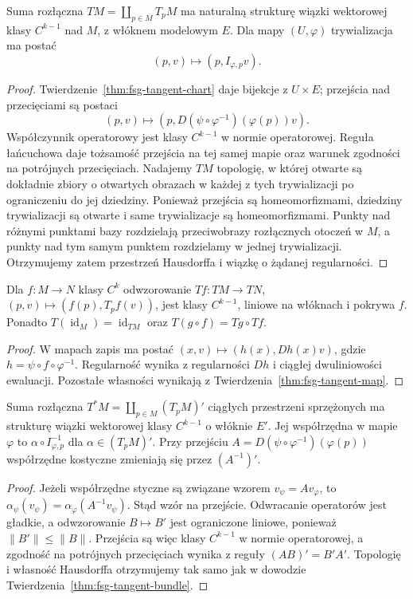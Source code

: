 \begin{twierdzenie}
\label{thm:fsg-tangent-bundle}
Suma rozłączna $TM=\coprod_{p\in M}T_pM$ ma naturalną
strukturę wiązki wektorowej klasy $C^{k-1}$ nad $M$,
z włóknem modelowym $E$. Dla mapy $(U,\varphi)$
trywializacja ma postać
\[
 (p,v)\longmapsto(p,I_{\varphi,p}v).
\]
\end{twierdzenie}
\begin{proof}
Twierdzenie~\ref{thm:fsg-tangent-chart} daje bijekcje
z $U\times E$; przejścia nad przecięciami są postaci
\[
 (p,v)\longmapsto
 (p,D(\psi\circ\varphi^{-1})(\varphi(p))v).
\]
Współczynnik operatorowy jest klasy $C^{k-1}$ w normie
operatorowej. Reguła łańcuchowa daje tożsamość
przejścia na tej samej mapie oraz warunek zgodności
na potrójnych przecięciach. Nadajemy $TM$ topologię,
w której otwarte są dokładnie zbiory o otwartych obrazach
w każdej z tych trywializacji po ograniczeniu do jej
dziedziny. Ponieważ przejścia są homeomorfizmami,
dziedziny trywializacji są otwarte i same trywializacje
są homeomorfizmami. Punkty nad różnymi punktami bazy
rozdzielają przeciwobrazy rozłącznych otoczeń w $M$,
a punkty nad tym samym punktem rozdzielamy w jednej
trywializacji. Otrzymujemy zatem przestrzeń Hausdorffa
i wiązkę o żądanej regularności.
\end{proof}

\begin{stwierdzenie}
\label{prop:fsg-tangent-functor}
Dla $f:M\to N$ klasy $C^k$ odwzorowanie
$Tf:TM\to TN$, $(p,v)\mapsto(f(p),T_pf(v))$,
jest klasy $C^{k-1}$, liniowe na włóknach i pokrywa $f$.
Ponadto $T(\operatorname{id}_M)=\operatorname{id}_{TM}$
oraz $T(g\circ f)=Tg\circ Tf$.
\end{stwierdzenie}
\begin{proof}
W mapach zapis ma postać $(x,v)\mapsto
(h(x),Dh(x)v)$, gdzie $h=\psi\circ f\circ\varphi^{-1}$.
Regularność wynika z regularności $Dh$ i ciągłej
dwuliniowości ewaluacji. Pozostałe własności wynikają
z Twierdzenia~\ref{thm:fsg-tangent-map}.
\end{proof}

\begin{twierdzenie}
\label{thm:fsg-cotangent-bundle}
Suma rozłączna $T^*M=\coprod_{p\in M}(T_pM)'$
ciągłych przestrzeni sprzężonych ma strukturę wiązki
wektorowej klasy $C^{k-1}$ o włóknie $E'$.
Jej współrzędna w mapie $\varphi$ to
$\alpha\circ I_{\varphi,p}^{-1}$ dla $\alpha\in(T_pM)'$.
Przy przejściu $A=D(\psi\circ\varphi^{-1})(\varphi(p))$
współrzędne kostyczne zmieniają się przez $(A^{-1})'$.
\end{twierdzenie}
\begin{proof}
Jeżeli współrzędne styczne są związane wzorem
$v_\psi=Av_\varphi$, to
$\alpha_\psi(v_\psi)=\alpha_\varphi(A^{-1}v_\psi)$.
Stąd wzór na przejście. Odwracanie operatorów jest gładkie,
a odwzorowanie $B\mapsto B'$ jest ograniczone liniowe,
ponieważ $\|B'\|\le\|B\|$. Przejścia są więc klasy
$C^{k-1}$ w normie operatorowej, a zgodność na potrójnych
przecięciach wynika z reguły $(AB)'=B'A'$.
Topologię i własność Hausdorffa otrzymujemy tak samo jak
w dowodzie Twierdzenia~\ref{thm:fsg-tangent-bundle}.
\end{proof}

